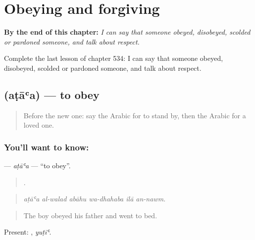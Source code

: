 
\chapter{Obeying and forgiving}
\label{ch:ar-obeying-and-forgiving}

\begin{chapteropening}
\textbf{By the end of this chapter:} \emph{I can say that someone obeyed, disobeyed, scolded or pardoned someone, and talk about respect.}

Complete the last lesson of chapter 534: I can say that someone obeyed, disobeyed, scolded or pardoned someone, and talk about respect.
\end{chapteropening}

\section[\texorpdfstring{\ar{أطاع} (aṭāʿa)}{أطاع (aṭāʿa)}]{ (aṭāʿa) — to obey}

\label{lesson:AR-C534-ataa}



\begin{quote}
Before the new one: say the Arabic for to stand by, then the Arabic for a loved one.
\end{quote}

\subsection*{You'll want to know: }
\textbf{} — \emph{aṭāʿa} — \textquotedblleft{}to obey\textquotedblright{}.

\begin{quote}
     .
\end{quote}

\begin{quote}
\emph{aṭāʿa al-walad abāhu wa-dhahaba ilā an-nawm.}
\end{quote}

\begin{quote}
The boy obeyed his father and went to bed.
\end{quote}

Present: , \emph{yuṭīʿ}.

